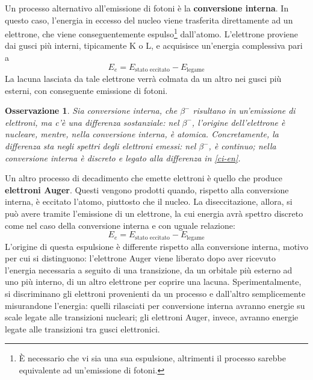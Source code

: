 \documentclass[11pt, a4paper]{scrartcl}
\theoremstyle{style}
\newtheorem{osservazione}{Osservazione}[section]
\theoremstyle{style1}
\numberwithin{equation}{subsection}
\begin{document}
Un processo alternativo all'emissione di fotoni \`e la \textbf{conversione interna}.
In questo caso, l'energia in eccesso del nucleo viene trasferita direttamente ad un elettrone, che viene conseguentemente espulso\footnote{\`E necessario che vi sia una sua espulsione, altrimenti il processo sarebbe equivalente ad un'emissione di fotoni.} dall'atomo.
L'elettrone proviene dai gusci pi\`u interni, tipicamente K o L, e acquisisce un'energia complessiva pari a 
\begin{equation}\label{ci-en}
	E_e = E_\text{stato eccitato} - E_\text{legame}
\end{equation}
La lacuna lasciata da tale elettrone verr\`a colmata da un altro nei gusci pi\`u esterni, con conseguente emissione di fotoni.
\begin{osservazione}
Sia conversione interna, che $\beta ^-$ risultano in un'emissione di elettroni, ma c'\`e una differenza sostanziale: nel $\beta ^-$, l'origine dell'elettrone \`e nucleare, mentre, nella conversione interna, \`e atomica.
Concretamente, la differenza sta negli spettri degli elettroni emessi: nel $\beta ^-$, \`e continuo; nella conversione interna \`e discreto e legato alla differenza in \ref{ci-en}.
\end{osservazione}

Un altro processo di decadimento che emette elettroni \`e quello che produce \textbf{elettroni Auger}. 
Questi vengono prodotti quando, rispetto alla conversione interna, \`e eccitato l'atomo, piuttosto che il nucleo.
La diseccitazione, allora, si pu\`o avere tramite l'emissione di un elettrone, la cui energia avr\`a spettro discreto come nel caso della conversione interna e con uguale relazione:
\begin{equation}
	E_e = E_\text{stato eccitato} - E_\text{legame}
\end{equation}
L'origine di questa espulsione \`e differente rispetto alla conversione interna, motivo per cui si distinguono: l'elettrone Auger viene liberato dopo aver ricevuto l'energia necessaria a seguito di una transizione, da un orbitale pi\`u esterno ad uno pi\`u interno, di un altro elettrone per coprire una lacuna.
Sperimentalmente, si discriminano gli elettroni provenienti da un processo e dall'altro semplicemente misurandone l'energia: quelli rilasciati per conversione interna avranno energie su scale legate alle transizioni nucleari; gli elettroni Auger, invece, avranno energie legate alle transizioni tra gusci elettronici.
\end{document}
